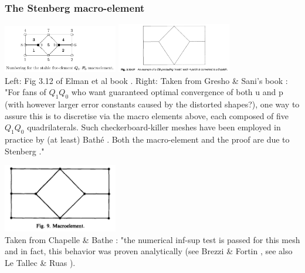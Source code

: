 
\subsubsection{The Stenberg macro-element} 

\begin{center}
\includegraphics[width=5cm]{images/meshtopos/elsw}
\includegraphics[width=5cm]{images/meshtopos/grsa}\\
{\captionfont Left: Fig 3.12 of Elman et al book \cite{elsw}.
Right: Taken from Gresho \& Sani's book \cite{grsa}: "For fans of $Q_1Q_0$ who want 
guaranteed optimal convergence of both u and p (with however larger error 
constants caused by the distorted shapes?), one way to assure this is
to discretise via the macro elements above, each composed of five $Q_1Q_0$
quadrilaterals. Such checkerboard-killer meshes have been employed in practice
by (at least) Bath\'e \cite{chba93}. Both the macro-element and the proof are
due to Stenberg \cite{sten84}."}
\end{center}

\begin{center}
\includegraphics[width=5cm]{images/meshtopos/chba93}\\
{\captionfont Taken from Chapelle \& Bathe \cite{chba93}: "the numerical inf-sup test is passed for this mesh and in fact,
this behavior was proven analytically (see Brezzi \& Fortin \cite{brfo}, see also Le Tallec \& Ruas \cite{leru86}).}
\end{center}

